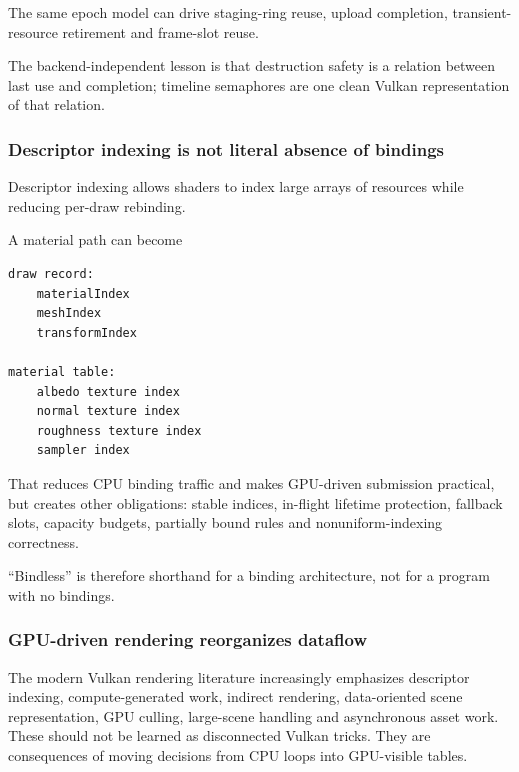 The same epoch model can drive staging-ring reuse, upload completion, transient-resource retirement and frame-slot reuse.

The backend-independent lesson is that destruction safety is a relation between last use and completion; timeline semaphores are one clean Vulkan representation of that relation.

\subsubsection{Descriptor indexing is not literal absence of bindings}\label{05-engine-i-ch023-descriptor-indexing-is-not-literal-absence-of-bindings}

\hypertarget{05-engine-i-ch023-descriptor-indexing-is-not-literal-absence-of-bindings}{}

Descriptor indexing allows shaders to index large arrays of resources while reducing per-draw rebinding.

A material path can become

\begin{verbatim}
draw record:
    materialIndex
    meshIndex
    transformIndex

material table:
    albedo texture index
    normal texture index
    roughness texture index
    sampler index
\end{verbatim}

That reduces CPU binding traffic and makes GPU-driven submission practical, but creates other obligations: stable indices, in-flight lifetime protection, fallback slots, capacity budgets, partially bound rules and nonuniform-indexing correctness.

``Bindless'' is therefore shorthand for a binding architecture, not for a program with no bindings.

\subsubsection{GPU-driven rendering reorganizes dataflow}\label{05-engine-i-ch023-gpu-driven-rendering-reorganizes-dataflow}

\hypertarget{05-engine-i-ch023-gpu-driven-rendering-reorganizes-dataflow}{}

The modern Vulkan rendering literature increasingly emphasizes descriptor indexing, compute-generated work, indirect rendering, data-oriented scene representation, GPU culling, large-scene handling and asynchronous asset work. These should not be learned as disconnected Vulkan tricks. They are consequences of moving decisions from CPU loops into GPU-visible tables.

